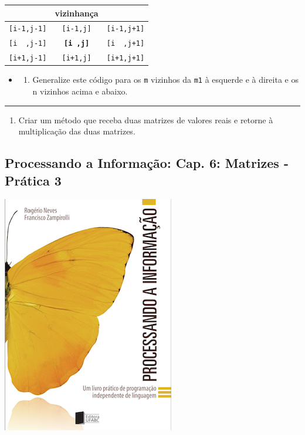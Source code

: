 \documentclass[12pt,a4paper]{article}
\renewcommand{\linethickness}{0.05em}
\providecommand{\tightlist}{%
      \setlength{\itemsep}{0pt}\setlength{\parskip}{0pt}}
\begin{document}
\begin{longtable}[]{@{}ccc@{}}
\toprule
& vizinhança &\tabularnewline
\midrule
\endhead
\texttt{{[}i-1,j-1{]}} & \texttt{{[}i-1,j{]}} &
\texttt{{[}i-1,j+1{]}}\tabularnewline
\texttt{{[}i\ \ ,j-1{]}} & \textbf{\texttt{{[}i\ ,j{]}}} &
\texttt{{[}i\ \ ,j+1{]}}\tabularnewline
\texttt{{[}i+1,j-1{]}} & \texttt{{[}i+1,j{]}} &
\texttt{{[}i+1,j+1{]}}\tabularnewline
\bottomrule
\end{longtable}

\begin{itemize}
\item
  \begin{enumerate}
  \def\labelenumi{\alph{enumi})}
  \setcounter{enumi}{1}
  \tightlist
  \item
    Generalize este código para os \texttt{m} vizinhos da \texttt{m1} à
    esquerde e à direita e os n vizinhos acima e abaixo.
  \end{enumerate}
\end{itemize}

    \begin{center}\rule{0.5\linewidth}{\linethickness}\end{center}

\begin{enumerate}
\def\labelenumi{\arabic{enumi}.}
\setcounter{enumi}{4}
\tightlist
\item
  Criar um método que receba duas matrizes de valores reais e retorne à
  multiplicação das duas matrizes.
\end{enumerate}

    \hypertarget{processando-a-informauxe7uxe3o-cap.-6-matrizes---pruxe1tica-3}{%
\subsection{Processando a Informação: Cap. 6: Matrizes - Prática
3}\label{processando-a-informauxe7uxe3o-cap.-6-matrizes---pruxe1tica-3}}

    \includegraphics{"figs/Capa_Processando_Informacao.jpg"}
\end{document}
